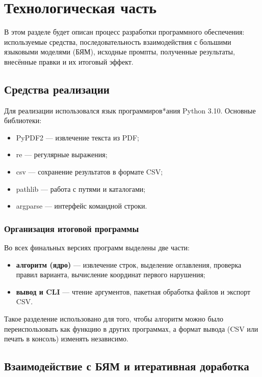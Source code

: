 \chapter{Технологическая часть}

В этом разделе будет описан процесс разработки программного обеспечения: используемые средства,
последовательность взаимодействия с большими языковыми моделями (БЯМ), исходные промпты,
полученные результаты, внесённые правки и их итоговый эффект.

\section{Средства реализации}

Для реализации использовался язык программиров*ания Python 3.10.
Основные библиотеки:
\begin{itemize}
  \item PyPDF2 — извлечение текста из PDF;
  \item re — регулярные выражения;
  \item csv — сохранение результатов в формате CSV;
  \item pathlib — работа с путями и каталогами;
  \item argparse — интерфейс командной строки.
\end{itemize}

\subsection{Организация итоговой программы}

Во всех финальных версиях программ выделены две части:
\begin{itemize}
  \item \textbf{алгоритм (ядро)} --- извлечение строк, выделение оглавления, проверка правил варианта,
  вычисление координат первого нарушения;
  \item \textbf{вывод и CLI} --- чтение аргументов, пакетная обработка файлов и экспорт CSV.
\end{itemize}

Такое разделение использовано для того, чтобы алгоритм можно было переиспользовать
как функцию в других программах, а формат вывода (CSV или печать в консоль) изменять независимо.

\section{Взаимодействие с БЯМ и итеративная доработка}

